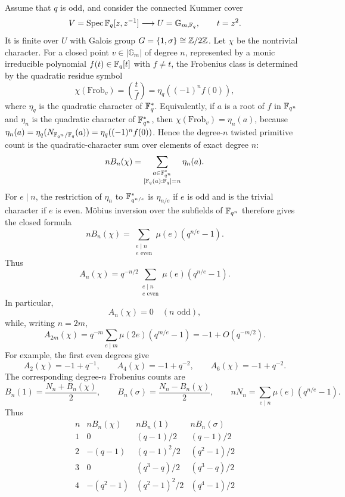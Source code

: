 \begin{example}\label{ex:cyclic-kummer-quotient-tomography}
Assume that \(q\) is odd, and consider the connected Kummer cover
\[
V=\operatorname{Spec} \mathbb{F}_q[z,z^{-1}]\longrightarrow U=\mathbb{G}_{m,\mathbb{F}_q},
\qquad t=z^2.
\]
It is finite \etale{} over \(U\) with Galois group \(G=\{1,\sigma\}\cong\mathbb{Z}/2\mathbb{Z}\). Let \(\chi\) be the nontrivial character. For a closed point \(v\in|\mathbb G_m|\) of degree \(n\), represented by a monic irreducible polynomial \(f(t)\in\mathbb{F}_q[t]\) with \(f\ne t\), the Frobenius class is determined by the quadratic residue symbol
\[
\chi(\mathrm{Frob}_v)=\left(\frac{t}{f}\right)=
\eta_q\!\left((-1)^nf(0)\right),
\]
where \(\eta_q\) is the quadratic character of \(\mathbb{F}_q^\ast\). Equivalently, if \(a\) is a root of \(f\) in \(\mathbb{F}_{q^n}\) and \(\eta_n\) is the quadratic character of \(\mathbb{F}_{q^n}^{\ast}\), then \(\chi(\mathrm{Frob}_v)=\eta_n(a)\), because \(\eta_n(a)=\eta_q(N_{\mathbb{F}_{q^n}/\mathbb{F}_q}(a))=\eta_q((-1)^nf(0))\). Hence the degree-\(n\) twisted primitive count is the quadratic-character sum over elements of exact degree \(n\):
\[
nB_n(\chi)=
\sum_{\substack{a\in\FF_{q^n}^{\ast}\\ [\FF_q(a):\FF_q]=n}}
\eta_n(a).
\]
For \(e\mid n\), the restriction of \(\eta_n\) to \(\mathbb{F}_{q^{n/e}}^{\ast}\) is \(\eta_{n/e}\) if \(e\) is odd and is the trivial character if \(e\) is even. M\"obius inversion over the subfields of \(\mathbb{F}_{q^n}\) therefore gives the closed formula
\[
nB_n(\chi)
=\sum_{\substack{e\mid n\\ e\text{ even}}}
\mu(e)(q^{n/e}-1).
\]
Thus
\[
A_n(\chi)=q^{-n/2}
\sum_{\substack{e\mid n\\ e\text{ even}}}
\mu(e)(q^{n/e}-1).
\]
In particular,
\[
A_n(\chi)=0\quad(n\text{ odd}),
\]
while, writing \(n=2m\),
\[
A_{2m}(\chi)
=q^{-m}\sum_{e\mid m}
\mu(2e)(q^{m/e}-1)
=-1+O(q^{-m/2}).
\]
For example, the first even degrees give
\[
A_2(\chi)=-1+q^{-1},
\qquad
A_4(\chi)=-1+q^{-2},
\qquad
A_6(\chi)=-1+q^{-2}.
\]
The corresponding degree-\(n\) Frobenius counts are
\[
B_n(1)=\frac{N_n+B_n(\chi)}2,
\qquad
B_n(\sigma)=\frac{N_n-B_n(\chi)}2,
\qquad
nN_n=\sum_{e\mid n}\mu(e)(q^{n/e}-1).
\]
Thus
\[
\begin{array}{c|c|c|c}
n& nB_n(\chi)& nB_n(1)&nB_n(\sigma)\\ \hline
1&0&(q-1)/2&(q-1)/2\\
2&-(q-1)&(q-1)^2/2&(q^2-1)/2\\
3&0&(q^3-q)/2&(q^3-q)/2\\
4&-(q^2-1)&(q^2-1)^2/2&(q^4-1)/2
\end{array}
\]
\end{example}
